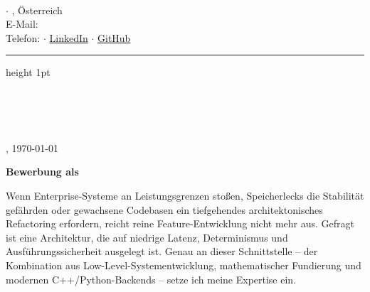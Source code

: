 \documentclass[11pt,a4paper]{article}
\begin{document}
\begin{minipage}[t]{0.55\textwidth}
    {\Large \bfseries \color{primary} \meinName}\\[0.2em]
    {\small \color{accent} \bfseries \stellenTitel}
\end{minipage}
\begin{minipage}[t]{0.45\textwidth}
    \raggedleft \footnotesize \color{textgray}
    \meineStrasse $\cdot$ \meinOrt, Österreich\\
    E-Mail: \href{mailto:\meineEmail}{\meineEmail}\\
    Telefon: \meineTel $\cdot$ \href{\meinLinkedin}{LinkedIn} $\cdot$ \href{\meinGithub}{GitHub}
\end{minipage}

\vspace{0.8em}
\color{accent}\hrule height 1pt
\vspace{1.0em}

\begin{minipage}[t]{0.55\textwidth}
    \color{primary} \small
    \textbf{\firmenName}\\[0.15em]
    \ansprechPartner\\[0.15em]
    \firmenAdresse\\[0.15em]
\end{minipage}
\begin{minipage}[t]{0.45\textwidth}
    \raggedleft \small \color{textgray}
    \meinOrt, \today
\end{minipage}

\vspace{1.2em}

\vspace{0.8cm}
{\Large\bfseries\color{primary} Bewerbung als \stellenTitel}


\vspace{0.6em}

\color{primary} \small

\anrede

Wenn Enterprise-Systeme an Leistungsgrenzen stoßen, Speicherlecks die Stabilität gefährden oder gewachsene Codebasen ein tiefgehendes architektonisches Refactoring erfordern, reicht reine Feature-Entwicklung nicht mehr aus. Gefragt ist eine Architektur, die auf niedrige Latenz, Determinismus und Ausführungssicherheit ausgelegt ist. Genau an dieser Schnittstelle – der Kombination aus Low-Level-Systementwicklung, mathematischer Fundierung und modernen C++/Python-Backends – setze ich meine Expertise ein.
\end{document}
